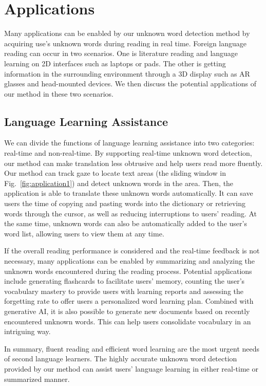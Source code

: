 \section{Applications}
Many applications can be enabled by our unknown word detection method by acquiring use's unknown words during reading in real time. Foreign language reading can occur in two scenarios. One is literature reading and language learning on 2D interfaces such as laptops or pads. The other is getting information in the surrounding environment through a 3D display such as AR glasses and head-mounted devices. We then discuss the potential applications of our method in these two scenarios.


\subsection{Language Learning Assistance}

We can divide the functions of language learning assistance into two categories: real-time and non-real-time. By supporting real-time unknown word detection, our method can make translation less obtrusive and help users read more fluently. Our method can track gaze to locate text areas (the sliding window in Fig.~\ref{fig:application1}) and detect unknown words in the area. Then, the application is able to translate these unknown words automatically. It can save users the time of copying and pasting words into the dictionary or retrieving words through the cursor, as well as reducing interruptions to users' reading. At the same time, unknown words can also be automatically added to the user's word list, allowing users to view them at any time. 

If the overall reading performance is considered and the real-time feedback is not necessary, many applications can be enabled by summarizing and analyzing the unknown words encountered during the reading process. Potential applications include generating flashcards to facilitate users' memory, counting the user's vocabulary mastery to provide users with learning reports and assessing the forgetting rate to offer users a personalized word learning plan. Combined with generative AI, it is also possible to generate new documents based on recently encountered unknown words. This can help users consolidate vocabulary in an intriguing way.

In summary, fluent reading and efficient word learning are the most urgent needs of second language learners. The highly accurate unknown word detection provided by our method can assist users' language learning in either real-time or summarized manner.

